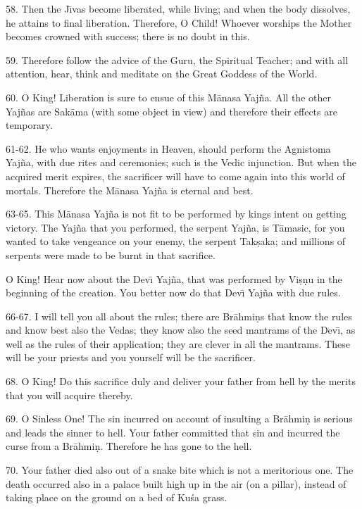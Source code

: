 58. Then the J\={\i}vas become liberated, while living; and when the body dissolves, he attains to final liberation. Therefore, O Child! Whoever worships the Mother becomes crowned with success; there is no doubt in this.

59. Therefore follow the advice of the Guru, the Spiritual Teacher; and with all attention, hear, think and meditate on the Great Goddess of the World.

60. O King! Liberation is sure to ensue of this M\=anasa Yaj\~na. All the other Yaj\~nas are Sak\=ama (with some object in view) and therefore their effects are temporary.

61-62. He who wants enjoyments in Heaven, should perform the Agnistoma Yaj\~na, with due rites and ceremonies; such is the Vedic injunction. But when the acquired merit expires, the sacrificer will have to come again into this world of mortals. Therefore the M\=anasa Yaj\~na is eternal and best.

63-65. This M\=anasa Yaj\~na is not fit to be performed by kings intent on getting victory. The Yaj\~na that you performed, the serpent Yaj\~na, is T\=amasic, for you wanted to take vengeance on your enemy, the serpent Tak\d{s}aka; and millions of serpents were made to be burnt in that sacrifice.

O King! Hear now about the Dev\={\i} Yaj\~na, that was performed by Vi\d{s}\d{n}u in the beginning of the creation. You better now do that Dev\={\i} Yaj\~na with due rules.

66-67. I will tell you all about the rules; there are Br\=ahmi\d{n}s that know the rules and know best also the Vedas; they know also the seed mantrams of the Dev\={\i}, as well as the rules of their application; they are clever in all the mantrams. These will be your priests and you yourself will be the sacrificer.

68. O King! Do this sacrifice duly and deliver your father from hell by the merits that you will acquire thereby.

69. O Sinless One! The sin incurred on account of insulting a Br\=ahmi\d{n} is serious and leads the sinner to hell. Your father committed that sin and incurred the curse from a Br\=ahmi\d{n}. Therefore he has gone to the hell.

70. Your father died also out of a snake bite which is not a meritorious one. The death occurred also in a palace built high up in the air (on a pillar), instead of taking place on the ground on a bed of Ku\'sa grass.

